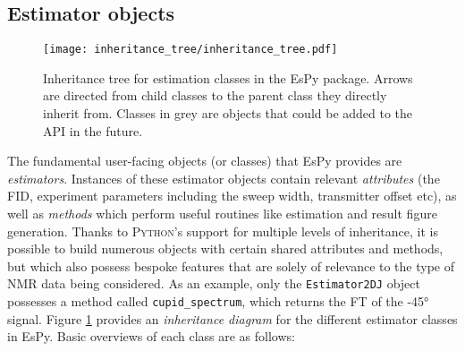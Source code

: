 \subsection{Estimator objects}
\begin{figure}
    \centering
    \texttt{[image: inheritance\_tree/inheritance\_tree.pdf]}
    \caption[
        Inheritance tree for estimation classes in the \acs{EsPy} package.
    ]{
        Inheritance tree for estimation classes in the \acs{EsPy} package.
        Arrows are directed from child classes to the parent class they
        directly inherit from. Classes in grey are objects that could be added
        to the \ac{API} in the future.
    }
    \label{fig:inheritance}
\end{figure}
The fundamental user-facing objects (or classes) that \ac{EsPy} provides are
\emph{estimators}.
Instances of these estimator objects contain relevant
\emph{attributes} (the \ac{FID}, experiment parameters including the sweep
width, transmitter offset etc), as well as \emph{methods} which perform useful
routines like estimation and result figure generation.
Thanks to \textsc{Python}'s support for multiple levels of inheritance, it is
possible to build numerous objects with certain shared attributes and methods,
but which also possess bespoke features that are solely of relevance to
the type of \ac{NMR} data being considered. As an example, only the
\texttt{Estimator2DJ} object possesses a method called \texttt{cupid\_spectrum},
which returns the \ac{FT} of the \ang{-45} signal.
Figure \ref{fig:inheritance} provides an \emph{inheritance
diagram} for the different estimator classes in \ac{EsPy}. Basic overviews of
each class are as follows:

